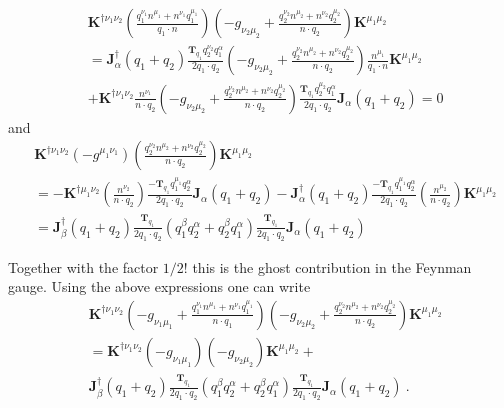 \documentclass[a4paper,11pt]{article}
\numberwithin{equation}{section}
\newcommand{\ldot}{\!\cdot\!}
\newcommand{\bd}[1]{\mathbf{#1}}
\begin{document}
\begin{align*}
 &\bd{K}^{\dagger\nu_1\nu_2} 
 \left( 
 \frac{q_1^{\nu_1}n^{\mu_1}+ n^{\nu_1}q_1^{\mu_1}}{q_1\cdot n}
 \right) 
  \left( 
 -g_{\nu_2\mu_2}+ \frac{q_2^{\nu_2}n^{\mu_2}+ n^{\nu_2}q_2^{\mu_2}}{n\cdot q_2}
 \right) 
 \bd{K}^{\mu_1\mu_2}\\
 &=
 \bd{J}^\dagger_\alpha(q_1+q_2)    \frac{ \bd{T}_{q_1} q_2^{\nu_2} q_1^\alpha}{2q_1\ldot q_2} 
  \left( 
 -g_{\nu_2\mu_2}+ \frac{q_2^{\nu_2}n^{\mu_2}+ n^{\nu_2}q_2^{\mu_2}}{n\cdot q_2}
 \right) 
 \frac{n^{\mu_1}}{q_1 \cdot n} \bd{K}^{\mu_1\mu_2}\\
&+
\bd{K}^{\dagger\nu_1\nu_2} 
 \frac{n^{\nu_1}}{n\cdot q_2}
 \left( 
 -g_{\nu_2\mu_2}+ \frac{q_2^{\nu_2}n^{\mu_2}+ n^{\nu_2}q_2^{\mu_2}}{n\cdot q_2}
 \right) 
 \frac{\bd{T}_{q_1} q_2^{\mu_2} q_1^\alpha}{2q_1\ldot q_2}  \bd{J}_\alpha(q_1+q_2)=0
\end{align*}
and
\begin{align*}
& \bd{K}^{\dagger\nu_1\nu_2} 
 \left( 
 -g^{\mu_1\nu_1}
 \right) 
  \left( 
 \frac{q_2^{\nu_2}n^{\mu_2}+ n^{\nu_2}q_2^{\mu_2}}{n\cdot q_2}
 \right) 
 \bd{K}^{\mu_1\mu_2}
 \\
 &=
- \bd{K}^{\dagger\mu_1\nu_2} 
  \left( 
\frac{n^{\nu_2}}{n\cdot q_2}
 \right) 
 \frac{- \bd{T}_{q_1} q_1^{\mu_1} q_2^\alpha}{2q_1\ldot q_2}  \bd{J}_\alpha(q_1+q_2)
-
\bd{J}^\dagger_\alpha(q_1+q_2)  \frac{ -\bd{T}_{q_1} q_1^{\mu_1} q_2^\alpha}{2q_1\ldot q_2}  
  \left( 
\frac{n^{\mu_2}}{n\cdot q_2}
 \right) 
 \bd{K}^{\mu_1\mu_2} \\
  &=
 \bd{J}^\dagger_\beta(q_1+q_2) \frac{ \bd{T}_{q_1} }{2q_1\ldot q_2} 
  \left( q_1^\beta q_2^\alpha+q_2^\beta q_1^\alpha
 \right) 
 \frac{ \bd{T}_{q_1}  }{2q_1\ldot q_2}  \bd{J}_\alpha(q_1+q_2)
\end{align*}

Together with the factor $1/2!$ this is the ghost contribution in the Feynman gauge. Using the above expressions one can write
\begin{align}
& \bd{K}^{\dagger\nu_1\nu_2} 
 \left( 
 -g_{\nu_1\mu_1}+ \frac{q_1^{\nu_1}n^{\mu_1}+ n^{\nu_1}q_1^{\mu_1}}{n\cdot q_1}
 \right) 
  \left( 
 -g_{\nu_2\mu_2}+ \frac{q_2^{\nu_2}n^{\mu_2}+ n^{\nu_2}q_2^{\mu_2}}{n\cdot q_2}
 \right) 
 \bd{K}^{\mu_1\mu_2}\nonumber\\
 &= 
\bd{K}^{\dagger\nu_1\nu_2} 
 \left( 
 -g_{\nu_1\mu_1}
 \right) 
  \left( 
 -g_{\nu_2\mu_2}
 \right) 
 \bd{K}^{\mu_1\mu_2}+ \\
 &\bd{J}^\dagger_\beta(q_1+q_2) \frac{ \bd{T}_{q_1} }{2q_1\ldot q_2} 
  \left( q_1^\beta q_2^\alpha+q_2^\beta q_1^\alpha
 \right) 
 \frac{ \bd{T}_{q_1}  }{2q_1\ldot q_2}  \bd{J}_\alpha(q_1+q_2)~.\nonumber
\end{align}
\end{document}
